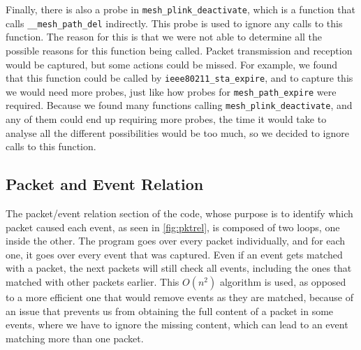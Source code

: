 Finally, there is also a probe in \texttt{mesh\_plink\_deactivate}, which is a
function that calls \texttt{\_\_mesh\_path\_del} indirectly. This probe is used
to ignore any calls to this function. The reason for this is that we were not
able to determine all the possible reasons for this function being called.
Packet transmission and reception would be captured, but some actions could be
missed. For example, we found that this function could be called by
\texttt{ieee80211\_sta\_expire}, and to capture this we would need more probes,
just like how probes for \texttt{mesh\_path\_expire} were required. Because we
found many functions calling \texttt{mesh\_plink\_deactivate}, and any of them
could end up requiring more probes, the time it would take to analyse all the
different possibilities would be too much, so we decided to ignore calls to this
function.


\subsection{Packet and Event Relation}\label{subsec:relate}

The packet/event relation section of the code, whose purpose is to identify
which packet caused each event, as seen in \autoref{fig:pktrel}, is composed of
two loops, one inside the other. The program goes over every packet
individually, and for each one, it goes over every event that was captured. Even
if an event gets matched with a packet, the next packets will still check all
events, including the ones that matched with other packets earlier. This
$O(n^2)$ algorithm is used, as opposed to a more efficient one that would remove
events as they are matched, because of an issue that prevents us from obtaining
the full content of a packet in some events, where we have to ignore the missing
content, which can lead to an event matching more than one packet.

